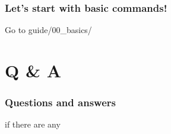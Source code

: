 \documentclass{beamer}
\begin{document}
\begin{frame}
    \frametitle{Let's start with basic commands!}

    Go to guide/00\_basics/

\end{frame}


\section{Q & A}

\begin{frame}
    \frametitle{Questions and answers}

    if there are any


\end{frame}

\end{document}
